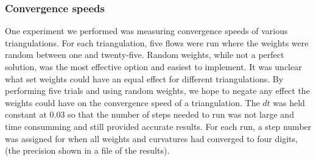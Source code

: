 \documentclass[12pt]{article}
\begin{document}
\subsubsection{Convergence speeds}

One experiment we performed was measuring convergence speeds of various triangulations. For each triangulation, five flows were run where the weights were random between one and twenty-five. Random weights, while not a perfect solution, was the most effective option and easiest to implement. It was unclear what set weights could have an equal effect for different triangulations. By performing five trials and using random weights, we hope to negate any effect the weights could have on the convergence speed of a triangulation. The $dt$ was held constant at 0.03 so that the number of steps needed to run was not large and time consumming and still provided accurate results. For each run, a step number was assigned for when all weights and curvatures had converged to four digits, (the precision shown in a file of the results).\newline
\end{document}
